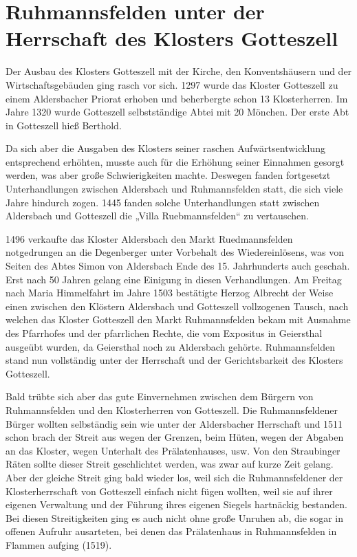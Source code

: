 \documentclass[12pt,a4paper]{book}
\begin{document}
\section{Ruhmannsfelden unter der Herrschaft des Klosters Gotteszell}

Der Ausbau des Klosters Gotteszell mit der Kirche, den Konventshäusern
und der Wirtschaftsgebäuden ging rasch vor sich. 1297 wurde das Kloster
Gotteszell zu einem Aldersbacher Priorat erhoben und beherbergte schon
13 Klosterherren. Im Jahre 1320 wurde Gotteszell selbstständige Abtei
mit 20 Mönchen. Der erste Abt in Gotteszell hieß Berthold.

Da sich aber die Ausgaben des Klosters seiner raschen
Aufwärtsentwicklung entsprechend erhöhten, musste auch für die Erhöhung
seiner Einnahmen gesorgt werden, was aber große Schwierigkeiten machte.
Deswegen fanden fortgesetzt Unterhandlungen zwischen Aldersbach und
Ruhmannsfelden statt, die sich viele Jahre hindurch zogen. 1445 fanden
solche Unterhandlungen statt zwischen Aldersbach und Gotteszell die
„Villa Ruebmannsfelden“ zu vertauschen.

1496 verkaufte das Kloster Aldersbach den Markt Ruedmannsfelden
notgedrungen an die Degenberger unter Vorbehalt des Wiedereinlösens, was
von Seiten des Abtes Simon von Aldersbach Ende des 15. Jahrhunderts auch
geschah. Erst nach 50 Jahren gelang eine Einigung in diesen
Verhandlungen. Am Freitag nach Maria Himmelfahrt im Jahre 1503
bestätigte Herzog Albrecht der Weise einen zwischen den Klöstern
Aldersbach und Gotteszell vollzogenen Tausch, nach welchen das Kloster
Gotteszell den Markt Ruhmannsfelden bekam mit Ausnahme des Pfarrhofes
und der pfarrlichen Rechte, die vom Expositus in Geiersthal ausgeübt
wurden, da Geiersthal noch zu Aldersbach gehörte. Ruhmannsfelden stand
nun vollständig unter der Herrschaft und der Gerichtsbarkeit des
Klosters Gotteszell.

Bald trübte sich aber das gute Einvernehmen zwischen dem Bürgern von
Ruhmannsfelden und den Klosterherren von Gotteszell. Die
Ruhmannsfeldener Bürger wollten selbständig sein wie unter der
Aldersbacher Herrschaft und 1511 schon brach der Streit aus wegen der
Grenzen, beim Hüten, wegen der Abgaben an das Kloster, wegen Unterhalt
des Prälatenhauses, usw. Von den Straubinger Räten sollte dieser Streit
geschlichtet werden, was zwar auf kurze Zeit gelang. Aber der gleiche
Streit ging bald wieder los, weil sich die Ruhmannsfeldener der
Klosterherrschaft von Gotteszell einfach nicht fügen wollten, weil sie
auf ihrer eigenen Verwaltung und der Führung ihres eigenen Siegels
hartnäckig bestanden. Bei diesen Streitigkeiten ging es auch nicht ohne
große Unruhen ab, die sogar in offenen Aufruhr ausarteten, bei denen das
Prälatenhaus in Ruhmannsfelden in Flammen aufging (1519).
\end{document}
